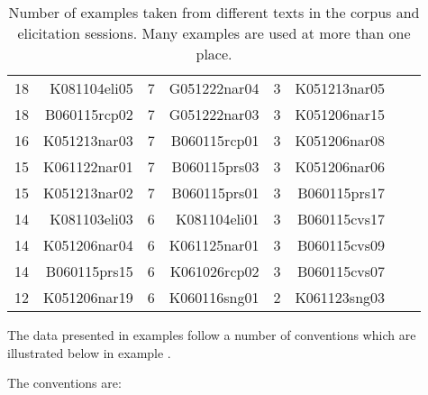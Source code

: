 \begin{table}[p]
\begin{tabular}{rrrrrrrr}
 18 &\ttfamily K081104eli05 & 7  &\ttfamily  G051222nar04 &3 & \ttfamily K051213nar05 &   &\ttfamily \\
 18 &\ttfamily B060115rcp02 & 7  &\ttfamily  G051222nar03 &3 & \ttfamily K051206nar15 &&\ttfamily  \\
 16 &\ttfamily K051213nar03 & 7  &\ttfamily  B060115rcp01 &3 & \ttfamily K051206nar08 &&\ttfamily  \\
 15 &\ttfamily K061122nar01 & 7  &\ttfamily  B060115prs03 &3 & \ttfamily K051206nar06 &&\ttfamily  \\
 15 &\ttfamily K051213nar02 & 7  &\ttfamily  B060115prs01 &3 & \ttfamily B060115prs17 &&\ttfamily  \\
 14 &\ttfamily K081103eli03 & 6  &\ttfamily  K081104eli01 &3 & \ttfamily B060115cvs17 &&\ttfamily  \\
 14 &\ttfamily K051206nar04 & 6  &\ttfamily  K061125nar01 &3 & \ttfamily B060115cvs09 &&\ttfamily  \\
 14 &\ttfamily B060115prs15 & 6  &\ttfamily  K061026rcp02 &3 & \ttfamily B060115cvs07 &&\ttfamily  \\
 12 &\ttfamily K051206nar19 & 6  &\ttfamily  K060116sng01 &2 & \ttfamily K061123sng03 &&\ttfamily
\end{tabular}
\caption[Number of examples taken from different texts in the corpus]{Number of examples taken from different texts in the corpus and elicitation sessions. Many examples are used at more than one place.}
\label{tab:meth:corpus}
\end{table}
 


The data presented in examples follow a number of conventions which are illustrated below in example .


\noindent
The conventions are:

